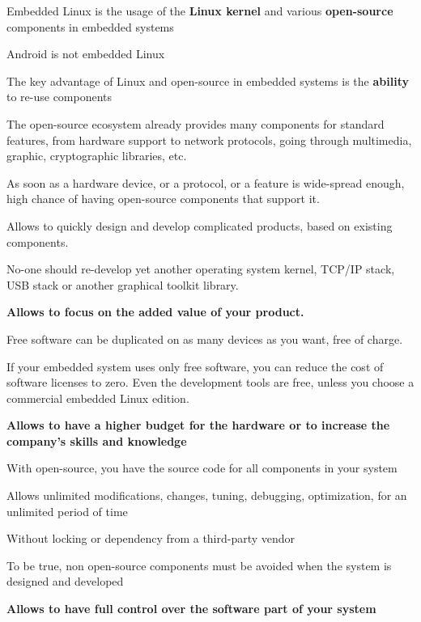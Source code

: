 \startitemize
\item Embedded Linux is the usage of the {\bf Linux kernel} and various
  {\bf open-source} components in embedded systems
\item Android is not embedded Linux
\stopitemize

\startitemize
\item The key advantage of Linux and open-source in embedded systems
  is the {\bf ability} to re-use components
\item The open-source ecosystem already provides many components for
  standard features, from hardware support to network protocols,
  going through multimedia, graphic, cryptographic libraries, etc.
\item As soon as a hardware device, or a protocol, or a feature is
  wide-spread enough, high chance of having open-source components
  that support it.
\item Allows to quickly design and develop complicated products,
  based on existing components.
\item No-one should re-develop yet another operating system kernel,
  TCP/IP stack, USB stack or another graphical toolkit library.
\item {\bf Allows to focus on the added value of your product.}
\stopitemize

\startitemize
\item Free software can be duplicated on as many devices as you
  want, free of charge.
\item If your embedded system uses only free software, you can
  reduce the cost of software licenses to zero. Even the development
  tools are free, unless you choose a commercial embedded Linux
  edition.
\item {\bf Allows to have a higher budget for the hardware or to
  increase the company’s skills and knowledge}
\stopitemize

\startitemize
\item With open-source, you have the source code for all components
  in your system
\item Allows unlimited modifications, changes, tuning, debugging,
  optimization, for an unlimited period of time
\item Without locking or dependency from a third-party vendor
  \startitemize
  \item To be true, non open-source components must be avoided when
    the system is designed and developed
  \stopitemize
\item {\bf Allows to have full control over the software part of
  your system}
\stopitemize

